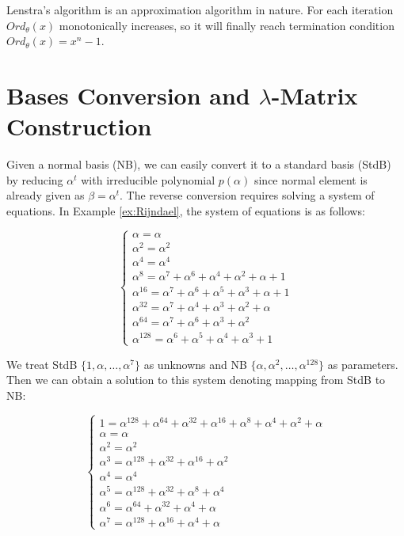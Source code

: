 Lenstra's algorithm is an approximation algorithm in nature. For each iteration $Ord_\theta(x)$ monotonically increases,
so it will finally reach termination condition $Ord_\theta(x) = x^n-1$.
\section{Bases Conversion and $\lambda$-Matrix Construction}
Given a normal basis (NB), we can easily convert it to a standard basis (StdB) by reducing $\alpha^t$
with irreducible polynomial $p(\alpha)$ since 
normal element is already given as $\beta = \alpha^t$. The reverse conversion requires 
solving a system of equations. In Example \ref{ex:Rijndael}, the system of equations
is as follows:

\begin{equation}
\begin{cases}
\alpha = \alpha \\
\alpha^2 = \alpha^2 \\
\alpha^4 = \alpha^4 \\
\alpha^8 = \alpha^7 + \alpha^6+\alpha^4+\alpha^2+\alpha+1\\
\alpha^{16} = \alpha^7+\alpha^6+\alpha^5+\alpha^3+\alpha+1\\
\alpha^{32} = \alpha^7+\alpha^4+\alpha^3+\alpha^2+\alpha\\
\alpha^{64} = \alpha^7+\alpha^6+\alpha^3+\alpha^2\\
\alpha^{128} = \alpha^6+\alpha^5+\alpha^4+\alpha^3+1
\end{cases}
\end{equation}

We treat StdB $\{1,\alpha,\dots,\alpha^7\}$ as unknowns and NB $\{\alpha,\alpha^2,\dots,\alpha^{128}\}$
as parameters. Then we can obtain a solution to this system denoting mapping from StdB to NB:

\begin{equation}
\begin{cases}
1 = \alpha^{128}+\alpha^{64}+\alpha^{32}+\alpha^{16}+\alpha^8+\alpha^4+\alpha^2+\alpha \\
\alpha = \alpha \\
\alpha^2 = \alpha^2 \\
\alpha^3 = \alpha^{128} + \alpha^{32}+\alpha^{16}+\alpha^2\\
\alpha^4 = \alpha^4\\
\alpha^5 = \alpha^{128} + \alpha^{32}+\alpha^{8}+\alpha^4\\
\alpha^6 = \alpha^{64} + \alpha^{32}+\alpha^{4}+\alpha\\
\alpha^7 = \alpha^{128} + \alpha^{16}+\alpha^{4}+\alpha
\end{cases}
\end{equation}

